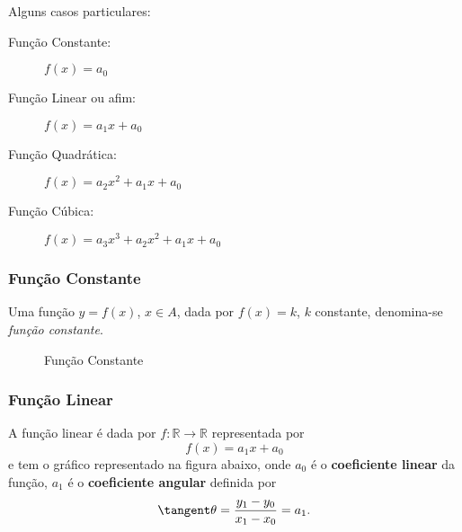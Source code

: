 	Alguns casos particulares:
	\begin{description}
		\item[Função Constante:] $f(x) = a_0$ 
		\item[Função Linear ou afim:] $f(x) = a_1x + a_0$
		\item[Função Quadrática:] $f(x) = a_2x^2 + a_1x + a_0$
		\item[Função Cúbica:]  $f(x) = a_3x^3 + a_2x^2 + a_1x + a_0$
	\end{description}

	\subsubsection{Função Constante}
	\label{sec:função_constante}
	
	Uma função $y = f(x)$, $x \in A$, dada por $f(x) = k$, $k$ constante, denomina-se \textit{função constante}.

\begin{figure}[ht]
    \centering
   \caption{Função Constante}
   \label{fig:func_const}
\end{figure}


	\subsubsection{Função Linear}
	\label{sec:função_linear}
	
	A função linear é dada por $f:\mathbb{R}\rightarrow \mathbb{R}$ representada por
	\begin{equation}
		f(x) = a_1x + a_0
	\end{equation}
	e tem o gráfico representado na figura abaixo, onde $a_0$ é o \textbf{coeficiente linear} da função, $a_1$ é o \textbf{coeficiente angular} definida por \[
	\tangent \theta = \frac{y_1 - y_0}{x_1 - x_0} = a_1
.\]		

